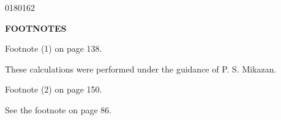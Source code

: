 \begin{scanpage}{0180}{162}
\begin{center}\textbf{FOOTNOTES}\end{center}
Footnote (1) on page 138.
\begin{flushright}\begin{minipage}{.51\linewidth}These calculations were performed under the guidance of P. S. Mikazan.\end{minipage}\end{flushright}
Footnote (2) on page 150.
\begin{flushright}\begin{minipage}{.51\linewidth}See the footnote on page 86.\end{minipage}\end{flushright}
\end{scanpage}
